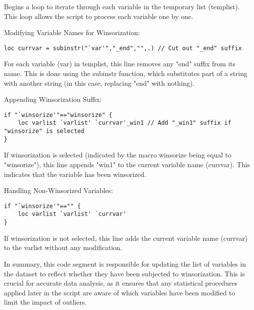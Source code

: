 \documentclass{article}
\begin{document}
Begins a loop to iterate through each variable in the temporary list (templist). This loop allows the script to process each variable one by one. \newline 


Modifying Variable Names for Winsorization:

\begin{mdframed}
\begin{verbatim}
loc currvar = subinstr("`var'","_end","",.) // Cut out "_end" suffix
\end{verbatim}
\end{mdframed}

For each variable (var) in templist, this line removes any "end" suffix from its name. This is done using the subinstr function, which substitutes part of a string with another string (in this case, replacing "end" with nothing).\newline 


Appending Winsorization Suffix:
\begin{mdframed}
\begin{verbatim}
if "`winsorize'"=="winsorize" {
    loc varlist `varlist' `currvar'_win1 // Add "_win1" suffix if "winsorize" is selected
}
\end{verbatim}
\end{mdframed}


If winsorization is selected (indicated by the macro winsorize being equal to "winsorize"), this line appends "win1" to the current variable name (currvar). This indicates that the variable has been winsorized.\newline 

Handling Non-Winsorized Variables:
\begin{mdframed}
\begin{verbatim}
if "`winsorize'"=="" {
    loc varlist `varlist' `currvar'
}
\end{verbatim}
\end{mdframed}

If winsorization is not selected, this line adds the current variable name (currvar) to the varlist without any modification.\newline 


In summary, this code segment is responsible for updating the list of variables in the dataset to reflect whether they have been subjected to winsorization. This is crucial for accurate data analysis, as it ensures that any statistical procedures applied later in the script are aware of which variables have been modified to limit the impact of outliers.
\end{document}
